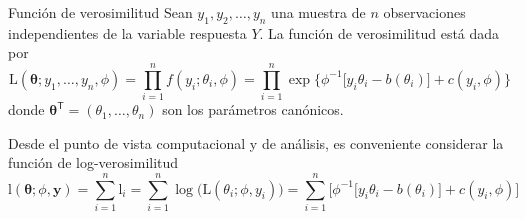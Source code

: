 \documentclass{beamer}
\begin{document}
\begin{frame}{Función de verosimilitud}
  Sean $y_1,y_2,\dots,y_n$ una muestra de $n$ observaciones independientes
  de la variable respuesta $Y$. La función de verosimilitud está dada por
  {\footnotesize
  \[
    \mathrm{L}(\bm{\theta};y_1,\dots,y_n,\phi)
    =\prod_{i=1}^{n} f(y_i;\theta_i,\phi)
    =\prod_{i=1}^{n}\exp\Big\{\phi^{-1}\big[y_i\theta_i-b(\theta_i)\big]+c(y_i,\phi)\Big\}
  \]}
  donde $\bm{\theta}^{\mathsf{T}}=(\theta_1,\dots,\theta_n)$ son los
  parámetros canónicos.

  \vspace{1em}
  Desde el punto de vista computacional y de análisis, es conveniente
  considerar la función de log-verosimilitud
  {\footnotesize
  \[
    \mathrm{l}(\bm{\theta};\phi,\bm{y})
    =\sum_{i=1}^{n}\mathrm{l}_i
    =\sum_{i=1}^{n}\log\big(\mathrm{L}(\theta_i;\phi,y_i)\big)
    =\sum_{i=1}^{n}\Big[\phi^{-1}\big[y_i\theta_i-b(\theta_i)\big]+c(y_i,\phi)\Big]
  \]}
\end{frame}
\end{document}
